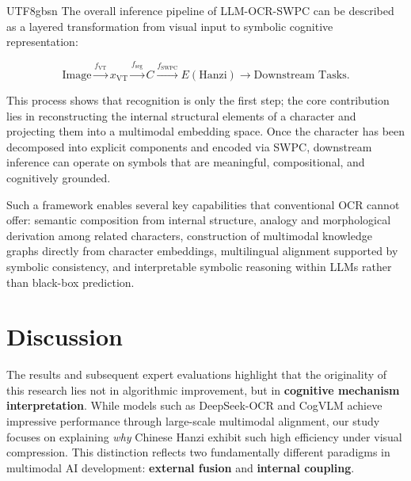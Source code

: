 \documentclass[conference]{IEEEtran}
\begin{document}
\begin{CJK*}{UTF8}{gbsn}
The overall inference pipeline of LLM-OCR-SWPC can be described as a layered
transformation from visual input to symbolic cognitive representation:

\[
\text{Image} 
\stackrel{f_{\mathrm{VT}}}{\longrightarrow} x_{\mathrm{VT}}
\stackrel{f_{\mathrm{seg}}}{\longrightarrow} C
\stackrel{f_{\mathrm{SWPC}}}{\longrightarrow} E(\text{Hanzi})
\longrightarrow \text{Downstream Tasks}.
\]

\vspace{0.2cm}
This process shows that recognition is only the first step; the core contribution lies in reconstructing the internal structural elements of a character and projecting them into a multimodal embedding space. Once the character has been decomposed into explicit components and encoded via SWPC, downstream inference can operate on symbols that are meaningful, compositional, and cognitively grounded.

Such a framework enables several key capabilities that conventional OCR cannot offer: semantic composition from internal structure, analogy and morphological derivation among related characters, construction of multimodal knowledge graphs directly from character embeddings, multilingual alignment supported by symbolic consistency, and interpretable symbolic reasoning within LLMs rather than black-box prediction. %

\section{Discussion}
\label{sec:discussion}

The results and subsequent expert evaluations highlight that the originality of this research lies not in algorithmic improvement, but in \textbf{cognitive mechanism interpretation}. While models such as DeepSeek-OCR \cite{wei2025deepseek} and CogVLM \cite{wang2024cogvlm} achieve impressive performance through large-scale multimodal alignment, our study focuses on explaining \textit{why} Chinese Hanzi exhibit such high efficiency under visual compression. This distinction reflects two fundamentally different paradigms in multimodal AI development: \textbf{external fusion} and \textbf{internal coupling}.


\end{CJK*}
\end{document}
